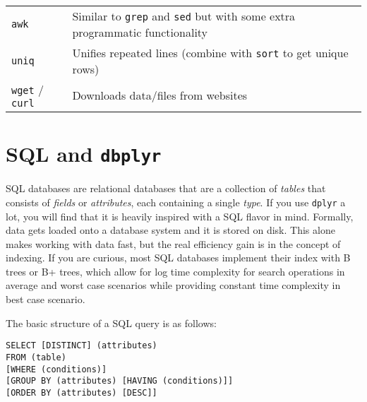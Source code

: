 \documentclass[
]{book}
\begin{document}
\begin{longtable}[]{@{}ll@{}}
\begin{minipage}[t]{0.41\columnwidth}\raggedright
\texttt{awk}\strut
\end{minipage} & \begin{minipage}[t]{0.53\columnwidth}\raggedright
Similar to \texttt{grep} and \texttt{sed} but with some extra programmatic functionality\strut
\end{minipage}\tabularnewline
\begin{minipage}[t]{0.41\columnwidth}\raggedright
\texttt{uniq}\strut
\end{minipage} & \begin{minipage}[t]{0.53\columnwidth}\raggedright
Unifies repeated lines (combine with \texttt{sort} to get unique rows)\strut
\end{minipage}\tabularnewline
\begin{minipage}[t]{0.41\columnwidth}\raggedright
\texttt{wget} / \texttt{curl}\strut
\end{minipage} & \begin{minipage}[t]{0.53\columnwidth}\raggedright
Downloads data/files from websites\strut
\end{minipage}\tabularnewline
\bottomrule
\end{longtable}

\hypertarget{sql-and-dbplyr}{%
\section{\texorpdfstring{SQL and \texttt{dbplyr}}{SQL and dbplyr}}\label{sql-and-dbplyr}}

SQL databases are relational databases that are a collection of \emph{tables} that consists of \emph{fields} or \emph{attributes}, each containing a single \emph{type}. If you use \texttt{dplyr} a lot, you will find that it is heavily inspired with a SQL flavor in mind. Formally, data gets loaded onto a database system and it is stored on disk. This alone makes working with data fast, but the real efficiency gain is in the concept of indexing. If you are curious, most SQL databases implement their index with B trees or B+ trees, which allow for log time complexity for search operations in average and worst case scenarios while providing constant time complexity in best case scenario.

The basic structure of a SQL query is as follows:

\begin{verbatim}
SELECT [DISTINCT] (attributes)
FROM (table)
[WHERE (conditions)]
[GROUP BY (attributes) [HAVING (conditions)]]
[ORDER BY (attributes) [DESC]]
\end{verbatim}
\end{document}
